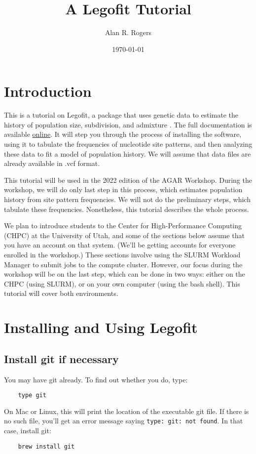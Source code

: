 \documentclass[11pt]{article}
\begin{document}
\title{A Legofit Tutorial}
\author{Alan R. Rogers}
\date{\today}
\maketitle

\section{Introduction}
This is a tutorial on Legofit, a package that uses genetic data to
estimate the history of population size, subdivision, and admixture
\citep{Rogers:BMC-20-526, Rogers:PCJ-2-e32}. The full documentation is
available
\href{http://alanrogers.github.io/legofit/html/index.html}{online}. It
will step you through the process of installing the software, using it
to tabulate the frequencies of nucleotide site patterns, and then
analyzing these data to fit a model of population history. We will
assume that data files are already available in .vcf format.

This tutorial will be used in the 2022 edition of the AGAR
Workshop. During the workshop, we will do only last step in this
process, which estimates population history from site pattern
frequencies. We will not do the preliminary steps, which tabulate
these frequencies. Nonetheless, this tutorial describes the whole
process.

We plan to introduce students to the Center for High-Performance
Computing (CHPC) at the University of Utah, and some of the sections
below assume that you have an account on that system. (We'll be
getting accounts for everyone enrolled in the workshop.) These
sections involve using the SLURM Workload Manager to submit jobs to
the compute cluster. However, our focus during the workshop will be on
the last step, which can be done in two ways: either on the CHPC
(using SLURM), or on your own computer (using the bash shell). This
tutorial will cover both environments.

\section{Installing and Using Legofit}
\subsection{Install git if necessary}
You may have git already. To find out whether you do, type:
\begin{verbatim}
    type git
\end{verbatim}
On Mac or Linux, this will print the location of the executable git
file. If there is no such file, you'll get an error message saying
\texttt{type: git: not found}. In that case, install git:
\begin{verbatim}
    brew install git
\end{verbatim}
\end{document}
